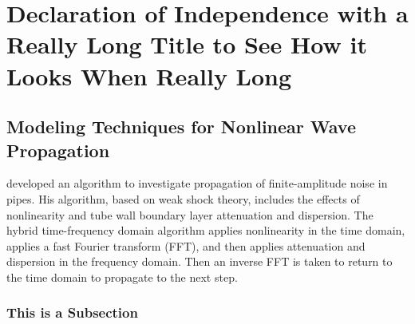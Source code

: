 \chapter{Declaration of Independence with a Really Long Title to See How it Looks When Really Long} \label{chapter1:introduction}

\section{\sloppy Modeling Techniques for Nonlinear Wave Propagation}
\citet{Gaubatz1999} developed an algorithm to investigate propagation of finite-am\-pli\-tude noise in pipes. His algorithm, based on weak shock theory, includes the effects of nonlinearity and tube wall boundary layer attenuation and dispersion. The hybrid time-frequency domain algorithm applies nonlinearity in the time domain, applies a fast Fourier transform (FFT), and then applies attenuation and dispersion in the frequency domain.  Then an inverse FFT is taken to return to the time domain to propagate to the next step.

\subsection{This is a Subsection}

